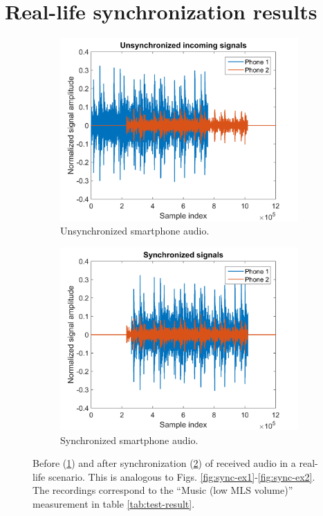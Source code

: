 \documentclass[a4paper, notitlepage]{report}
\begin{document}
\section{Real-life synchronization results}
\begin{figure}[H]
\begin{adjustwidth}{-1in}{-1in}
\centering
\begin{subfigure}{0.5\textwidth}
	\includegraphics[width=\textwidth]{figures/system_test/result_unsynced}
	\caption{Unsynchronized smartphone audio.}
	\label{app:result_unsynced}
	\end{subfigure}
\begin{subfigure}{0.5\textwidth}
	\includegraphics[width=\textwidth]{figures/system_test/result_synced}
	\caption{Synchronized smartphone audio.}
	\label{app:result_synced}
\end{subfigure}
\caption[Synchronization in a real-world scenario.]{Before (\ref{app:result_unsynced}) and after synchronization (\ref{app:result_synced}) of received audio in a real-life scenario. This is analogous to Figs. \ref{fig:sync-ex1}-\ref{fig:sync-ex2}. The recordings correspond to the ``Music (low MLS volume)'' measurement in table \ref{tab:test-result}.}
\label{app:result_synced_unsynced}
\end{adjustwidth}
\end{figure}
\end{document}
